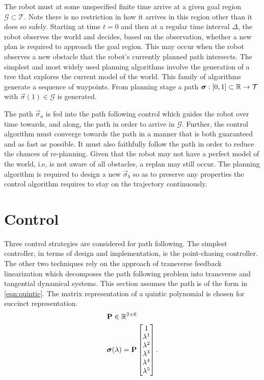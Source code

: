 The robot must at some unspecified finite time arrive at a given goal region $\mathcal{G}\subset\mathcal{T}$. Note there is no restriction in how it arrives in this region other than it does so safely. Starting at time $t=0$ and then at a regular time interval $\Delta$, the robot observes the world and decides, based on the observation, whether a new plan is required to approach the goal region. This may occur when the robot observes a new obstacle that the robot's currently planned path intersects. The simplest and most widely used planning algorithms involve the generation of a tree that explores the current model of the world. This family of algorithms generate a sequence of waypoints. From planning stage a path $\bm{\sigma}: [0,1]\subset\mathbb{R}\to\mathcal{T}$ with $\vec{\sigma}(1)\in\mathcal{G}$ is generated.

The path $\vec{\sigma}_a$ is fed into the path following control which guides the robot over time towards, and along, the path in order to arrive in $\mathcal{G}$. Further, the control algorithm must converge towards the path in a manner that is both guaranteed and as fast as possible. It must also faithfully follow the path in order to reduce the chances of re-planning. Given that the robot may not have a perfect model of the world, i.e, is not aware of all obstacles, a replan may still occur. The planning algorithm is required to design a new $\vec{\sigma}_b$ so as to preserve any properties the control algorithm requires to stay on the trajectory continuously.

\chapter{Control}\label{sec:control}
Three control strategies are considered for path following. The simplest controller, in terms of design and implementation, is the point-chasing controller. The other two techniques rely on the approach of transverse feedback linearization which decomposes the path following problem into transverse and tangential dynamical systems. This section assumes the path is of the form in \eqref{eqn:quintic}. The matrix representation of a quintic polynomial is chosen for succinct representation.
\begin{align}
    &\mathbf{P}\in\mathbb{R}^{2\times6} \nonumber \\
    &\bm{\sigma}(\lambda) =    \mathbf{P}
                                \begin{bmatrix}
                                    1 \\
                                    \lambda^1 \\
                                    \lambda^2 \\
                                    \lambda^3 \\
                                    \lambda^4 \\
                                    \lambda^5
                                \end{bmatrix}.
    \label{eqn:quintic}
\end{align}

